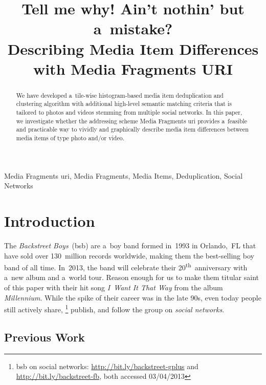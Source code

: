\documentclass{article}
\begin{document}
\sloppy

\newcommand{\ts}{\textsuperscript}

\title{Tell me why! Ain't nothin' but a~mistake?\\ Describing Media Item Differences with Media Fragments URI}
%
\address{}

\maketitle

%
\begin{abstract}
We have developed a~tile-wise histogram-based
media item deduplication and clustering algorithm
with additional high-level semantic matching criteria
that is tailored to photos and videos stemming from multiple social networks.
In this paper, we investigate whether the addressing scheme
Media Fragments {\sc uri} provides a~feasible and practicable way
to vividly and graphically describe media item differences
between media items of type photo and/or video.
\end{abstract}
%
\begin{keywords}
Media Fragments {\sc uri}, Media Fragments, Media Items, Deduplication, Social Networks
\end{keywords}
%
\section{Introduction}
\label{sec:introduction}

The \emph{Backstreet Boys}~({\sc bsb}) are a~boy band
formed in~1993 in Orlando,~FL
that have sold over 130~million records worldwide,
making them the best-selling boy band of all time.
In~2013, the band will celebrate their 20\ts{th}~anniversary
with a~new album and a~world tour.
Reason enough for us to make them titular saint of this paper
with their hit song \emph{I~Want It That Way}
from the album \emph{Millennium}.
While the spike of their career was in the late 90s,
even today people still actively share,%
\footnote{{\sc bsb} on social networks: \url{http://bit.ly/backstreet-gplus}
and \url{http://bit.ly/backstreet-fb},
both accessed 03/04/2013}
publish, and follow the group on \emph{social networks}.

\subsection{Previous Work}
\label{sec:previous-work}
\end{document}

